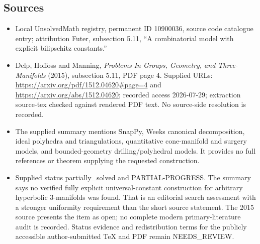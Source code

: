 \documentclass[11pt]{article}
\begin{document}
\subsection{Sources}
\begin{itemize}
\item Local UnsolvedMath registry, permanent ID 10900036, source code catalogue entry; attribution Futer, subsection 5.11, ``A combinatorial model with explicit bilipschitz constants.''
\item Delp, Hoffoss and Manning, \emph{Problems In Groups, Geometry, and Three-Manifolds} (2015), subsection 5.11, PDF page 4. Supplied URLs: \url{https://arxiv.org/pdf/1512.04620#page=4} and \url{https://arxiv.org/abs/1512.04620}; recorded access 2026-07-29; extraction source-tex checked against rendered PDF text. No source-side resolution is recorded.
\item The supplied summary mentions SnapPy, Weeks canonical decomposition, ideal polyhedra and triangulations, quantitative cone-manifold and surgery models, and bounded-geometry drilling/polyhedral models. It provides no full references or theorem supplying the requested construction.
\item Supplied status partially\_solved and PARTIAL-PROGRESS. The summary says no verified fully explicit universal-constant construction for arbitrary hyperbolic \(3\)-manifolds was found. That is an editorial search assessment with a stronger uniformity requirement than the short source statement. The 2015 source presents the item as open; no complete modern primary-literature audit is recorded. Status evidence and redistribution terms for the publicly accessible author-submitted TeX and PDF remain NEEDS\_REVIEW.
\end{itemize}
\end{document}
